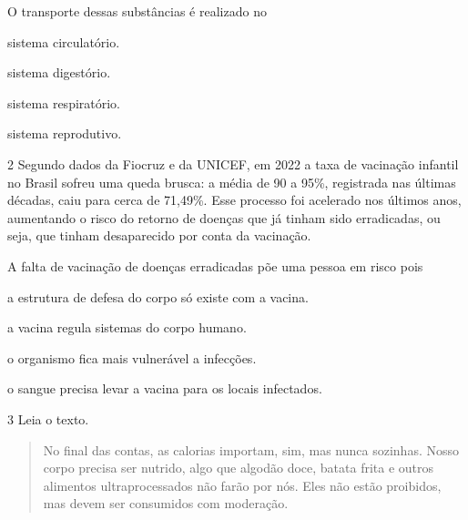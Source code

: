 O transporte dessas substâncias é realizado no

\begin{minipage}{.5\textwidth}
\begin{escolha}
\item sistema circulatório.

\item sistema digestório.

\item sistema respiratório.

\item sistema reprodutivo.
\end{escolha}
\end{minipage}

\num{2} Segundo dados da Fiocruz e da UNICEF, em 2022 a taxa de
vacinação infantil no Brasil sofreu uma queda brusca: a média de 90 a 95\%,
registrada nas últimas décadas, caiu para cerca de 71,49\%. Esse processo
foi acelerado nos últimos anos, aumentando o risco do retorno de doenças
que já tinham sido erradicadas, ou seja, que tinham desaparecido por conta
da vacinação. 

A falta de vacinação de doenças erradicadas põe uma pessoa em risco pois

\begin{escolha}
\item a estrutura de defesa do corpo só existe com a vacina.

\item a vacina regula sistemas do corpo humano.

\item o organismo fica mais vulnerável a infecções.

\item o sangue precisa levar a vacina para os locais infectados.
\end{escolha}



\num{3} Leia o texto.

\begin{quote}
No final das contas, as calorias importam, sim, mas nunca sozinhas.
Nosso corpo precisa ser nutrido, algo que algodão doce, batata frita e
outros alimentos ultraprocessados não farão por nós. Eles não estão
proibidos, mas devem ser consumidos com moderação.

\end{quote}

